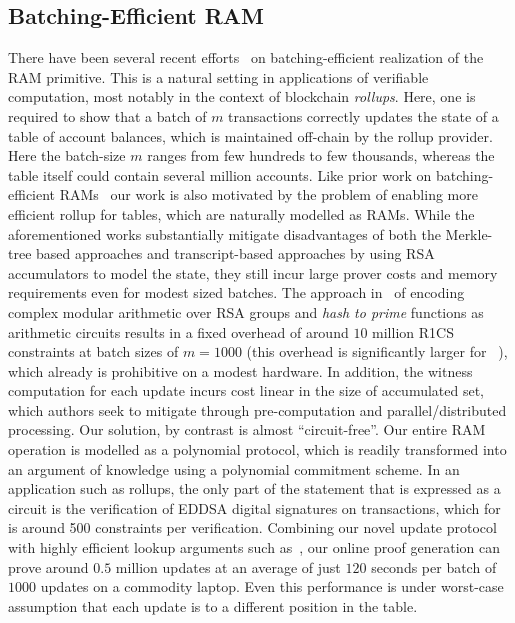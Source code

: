 \subsection{Batching-Efficient RAM}\label{subsec:batching-efficient-ram}
There have been several recent efforts~\cite{USENIX:OWWB20,CCS:CFHKKO22} on batching-efficient
realization of the RAM primitive. This is a natural setting in applications of verifiable
computation, most notably in the context of blockchain {\em rollups}. Here, one is required
to show that a batch of $m$ transactions correctly updates the state of a table of account balances, which
is maintained off-chain by the rollup provider. Here the batch-size $m$ ranges from few hundreds to few
thousands, whereas the table itself could contain several million accounts.
Like prior work on batching-efficient
RAMs~\cite{USENIX:OWWB20,CCS:CFHKKO22} our work is also motivated by the problem of enabling more efficient rollup for tables, which are
naturally modelled as RAMs. While the aforementioned works substantially mitigate disadvantages of both the
Merkle-tree based approaches and transcript-based approaches by using RSA accumulators to model the state,
they still incur large prover costs and memory requirements even for modest sized batches. The approach
in~\cite{USENIX:OWWB20,CCS:CFHKKO22} of encoding complex modular arithmetic over RSA groups and {\em hash
to prime} functions as arithmetic circuits results in a fixed overhead of around $10$ million R1CS constraints
at batch sizes of $m=1000$ (this overhead is significantly larger for ~\cite{USENIX:OWWB20}), which already
is prohibitive on a modest hardware. In addition, the witness computation for each update incurs cost
linear in the size of accumulated set, which authors seek to mitigate through pre-computation and
parallel/distributed processing. Our solution, by contrast is almost ``circuit-free''. Our entire
RAM operation is modelled as a polynomial protocol, which is readily transformed into an argument of
knowledge using a polynomial commitment scheme. In an application such as rollups, the only part of the statement 
that is expressed as a circuit is the verification of EDDSA digital signatures on transactions,
which for is around 500 constraints per verification.
Combining our novel update protocol with highly efficient
lookup arguments such as~\cite{CCS:CFHKKO22}, our online proof generation can prove around $0.5$ million
updates at an average of just $120$ seconds per batch of $1000$ updates on a commodity laptop. Even
this performance is under worst-case assumption that each update is to a different position in the table.
